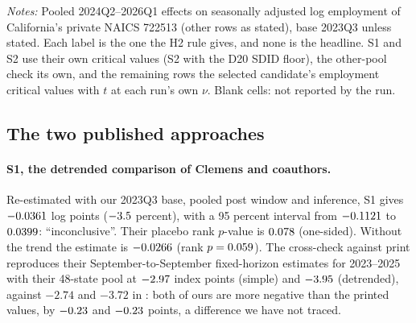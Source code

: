 \begin{table}[tbp]
\medskip
\begin{minipage}{\linewidth}\footnotesize
\emph{Notes:} Pooled 2024Q2--2026Q1 effects on seasonally adjusted log employment of California's
private NAICS 722513 (other rows as stated), base 2023Q3 unless stated. Each label is the one the
H2 rule gives, and none is the headline. S1 and S2 use their own critical values (S2 with the D20
SDID floor), the other-pool check its own, and the remaining rows the selected candidate's
employment critical values with $t$ at each run's own $\nu$. Blank cells: not reported by the run.
\end{minipage}
\end{table}

\subsection{The two published approaches}
\label{sec:rob-secondary}

\paragraph{S1, the detrended comparison of Clemens and coauthors.} Re-estimated with our 2023Q3
base, pooled post window and inference, S1 gives $-0.0361$ log points ($-3.5$ percent), with
a 95 percent interval from $-0.1121$ to $0.0399$: ``inconclusive''. Their placebo rank $p$-value
is $0.078$ (one-sided). Without the trend the estimate is $-0.0266$ (rank
$p = 0.059$). The cross-check against print reproduces their September-to-September
fixed-horizon estimates for 2023--2025 with their 48-state pool at $-2.97$ index points
(simple) and $-3.95$ (detrended), against $-2.74$ and $-3.72$ in
\citet[Table~3, Panel~B]{clemens2026employment}: both of ours are more negative than the printed
values, by $-0.23$ and $-0.23$ points, a difference we have not traced.

